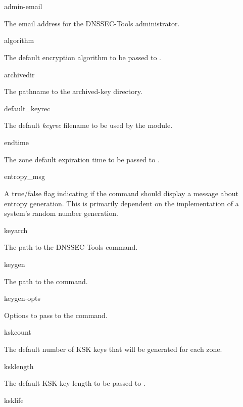\begin{description}

\item admin-email\verb" "

The email address for the DNSSEC-Tools administrator.

\item algorithm\verb" "

The default encryption algorithm to be passed to .

\item archivedir\verb" "

The pathname to the archived-key directory.

\item default\_keyrec\verb" "

The default {\it keyrec} filename to be used by the  module.

\item endtime\verb" "

The zone default expiration time to be passed to .

\item entropy\_msg\verb" "

A true/false flag indicating if the  command should display
a message about entropy generation.  This is primarily dependent on the
implementation of a system's random number generation.

\item keyarch\verb" "

The path to the DNSSEC-Tools  command.

\item keygen\verb" "

The path to the  command.

\item keygen-opts\verb" "

Options to pass to the  command.

\item kskcount\verb" "

The default number of KSK keys that will be generated for each zone.

\item ksklength\verb" "

The default KSK key length to be passed to .

\item ksklife\verb" "


\end{description}
